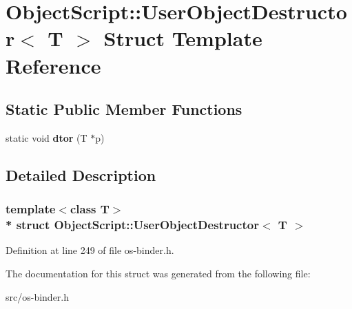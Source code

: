 \hypertarget{struct_object_script_1_1_user_object_destructor}{}\section{Object\+Script\+:\+:User\+Object\+Destructor$<$ T $>$ Struct Template Reference}
\label{struct_object_script_1_1_user_object_destructor}
\subsection*{Static Public Member Functions}
\begin{DoxyCompactItemize}
\item 
static void {\bfseries dtor} (T $\ast$p)\hypertarget{struct_object_script_1_1_user_object_destructor_ab57c8fa4516b2f96a5f333212f7e15dc}{}\label{struct_object_script_1_1_user_object_destructor_ab57c8fa4516b2f96a5f333212f7e15dc}

\end{DoxyCompactItemize}


\subsection{Detailed Description}
\subsubsection*{template$<$class T$>$\\*
struct Object\+Script\+::\+User\+Object\+Destructor$<$ T $>$}



Definition at line 249 of file os-\/binder.\+h.



The documentation for this struct was generated from the following file\+:\begin{DoxyCompactItemize}
\item 
src/os-\/binder.\+h\end{DoxyCompactItemize}
